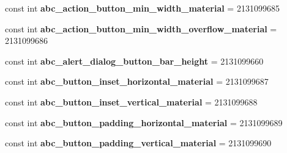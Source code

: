 \begin{DoxyCompactItemize}
\mbox{\label{class_sample_app_1_1_droid_1_1_resource_1_1_dimension_a39a4c2fb2109c12bbe7cc22d24090c07}} 
const int {\bfseries abc\+\_\+action\+\_\+button\+\_\+min\+\_\+width\+\_\+material} = 2131099685
\item 
\mbox{\label{class_sample_app_1_1_droid_1_1_resource_1_1_dimension_acc2c6782aeca3ba555249906db663bae}} 
const int {\bfseries abc\+\_\+action\+\_\+button\+\_\+min\+\_\+width\+\_\+overflow\+\_\+material} = 2131099686
\item 
\mbox{\label{class_sample_app_1_1_droid_1_1_resource_1_1_dimension_a8487ba0ced87a5af77f2b1517dcb66b1}} 
const int {\bfseries abc\+\_\+alert\+\_\+dialog\+\_\+button\+\_\+bar\+\_\+height} = 2131099660
\item 
\mbox{\label{class_sample_app_1_1_droid_1_1_resource_1_1_dimension_aab0a2d08ee0089913249001d8427dfca}} 
const int {\bfseries abc\+\_\+button\+\_\+inset\+\_\+horizontal\+\_\+material} = 2131099687
\item 
\mbox{\label{class_sample_app_1_1_droid_1_1_resource_1_1_dimension_a8841515e35b3ffa3dcc7472498c5d6cb}} 
const int {\bfseries abc\+\_\+button\+\_\+inset\+\_\+vertical\+\_\+material} = 2131099688
\item 
\mbox{\label{class_sample_app_1_1_droid_1_1_resource_1_1_dimension_a46b64f4a3ac1a79d9f8b924a155bc6ab}} 
const int {\bfseries abc\+\_\+button\+\_\+padding\+\_\+horizontal\+\_\+material} = 2131099689
\item 
\mbox{\label{class_sample_app_1_1_droid_1_1_resource_1_1_dimension_adf32db92117f55e28d1a278424d435d6}} 
const int {\bfseries abc\+\_\+button\+\_\+padding\+\_\+vertical\+\_\+material} = 2131099690
\item 
\mbox{\label{class_sample_app_1_1_droid_1_1_resource_1_1_dimension_acccbcf5b844d9b51c8965325f7b238b5}} 

\end{DoxyCompactItemize}
